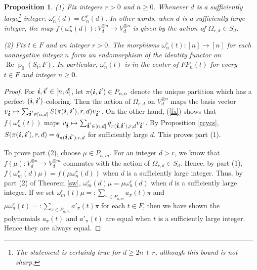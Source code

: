 \documentclass{amsart}
\def\bd#1{\mbox{\boldmath${#1}$}}
\newtheorem{proposition}[theorem]{Proposition}
\theoremstyle{definition}
\def\uRep{\underline{\operatorname{Re}}\!\operatorname{p}}
\renewcommand{\1}{_{(1)}}
\renewcommand{\2}{_{(2)}}
\newcommand{\3}{_{(3)}}
\newcommand{\4}{_{(4)}}
\begin{document}
\begin{proposition}\label{centralomega} (1) Fix integers $r>0$ and $n\geq 0$.  Whenever $d$ is a sufficiently large\footnote{The statement is certainly true for $d\geq 2n+r$, although this bound is not sharp.} integer, $\omega_n^r(d)=C_n^r(d)$.  In other words, when $d$ is a sufficiently large integer, the map $f(\omega_n^r(d)):V_d^{\otimes n}\to V_d^{\otimes n}$ is given by the action of $\Omega_{r, d}\in S_d$.

(2) Fix $t\in F$ and an integer $r>0$.  The morphisms $\omega_n^r(t): [n]\to[n]$ for each nonnegative integer $n$ form an endomorphism of the identity functor on $\uRep_0(S_t; F)$.  In particular, $\omega_n^r(t)$ is in the center of $FP_n(t)$ for every $t\in F$ and integer $n\geq 0$.


\end{proposition}

\begin{proof}  For ${\bd{i}}, {\bd{i}}'\in [n, d]$, let $\pi({{\bd{i}},{\bd{i}}'})\in P_{n,n}$ denote the unique partition  which has a perfect $({\bd{i}},{\bd{i}}')$-coloring.  Then the action of $\Omega_{r, d}$ on $V_d^{\otimes n}$ maps the basis vector $v_{\bd{i}}\mapsto \sum_{{\bd{i}}'\in [n, d]}S(\pi({\bd{i}},{\bd{i}}'), r, d)v_{{\bd{i}}'}$.  On the other hand, (\ref{fx}) shows that $f(\omega_n^r(t))$ maps $v_{\bd{i}}\mapsto \sum_{{\bd{i}}'\in [n, d]}q_{\pi({\bd{i}},{\bd{i}}'), r, d}v_{{\bd{i}}'}$.  By Proposition \ref{rcycs}, $S(\pi({\bd{i}},{\bd{i}}'), r, d)=q_{\pi({\bd{i}},{\bd{i}}'), r, d}$ for sufficiently large $d$.  This proves part (1).

To prove part (2), choose $\mu\in P_{n,m}$.  For an integer $d>r$, we know that $f(\mu):V_d^{\otimes n}\to V_d^{\otimes m}$ commutes with the action of $\Omega_{r, d}\in S_d$.  Hence, by part (1),  $f(\omega_m^r(d)\mu)=f(\mu\omega_n^r(d))$ when $d$ is a sufficiently large integer.  Thus, by part (2) of Theorem \ref{sw}, $\omega_m^r(d)\mu=\mu\omega_n^r(d)$ when $d$ is a sufficiently large integer.
If we set $\omega_m^r(t)\mu=:\sum_{\pi\in P_{n, m}}a_\pi(t)\pi$ and $\mu\omega_n^r(t)=:\sum_{\pi\in P_{n, m}}a'_\pi(t)\pi$ for each $t\in F$, then we have shown the polynomials $a_\pi(t)$ and $a'_\pi(t)$ are equal when $t$ is a sufficiently large integer.  Hence they are always equal.
\end{proof}


\end{document}
